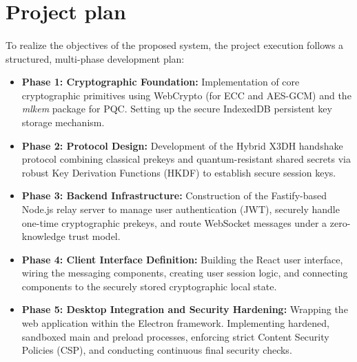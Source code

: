 \section{Project plan}
\paragraph{}
To realize the objectives of the proposed system, the project execution follows a structured, multi-phase development plan:
\begin{itemize}
	\item \textbf{Phase 1: Cryptographic Foundation:} Implementation of core cryptographic primitives using WebCrypto (for ECC and AES-GCM) and the \textit{mlkem} package for PQC. Setting up the secure IndexedDB persistent key storage mechanism.
	\item \textbf{Phase 2: Protocol Design:} Development of the Hybrid X3DH handshake protocol combining classical prekeys and quantum-resistant shared secrets via robust Key Derivation Functions (HKDF) to establish secure session keys.
	\item \textbf{Phase 3: Backend Infrastructure:} Construction of the Fastify-based Node.js relay server to manage user authentication (JWT), securely handle one-time cryptographic prekeys, and route WebSocket messages under a zero-knowledge trust model.
	\item \textbf{Phase 4: Client Interface Definition:} Building the React user interface, wiring the messaging components, creating user session logic, and connecting components to the securely stored cryptographic local state.
	\item \textbf{Phase 5: Desktop Integration and Security Hardening:} Wrapping the web application within the Electron framework. Implementing hardened, sandboxed main and preload processes, enforcing strict Content Security Policies (CSP), and conducting continuous final security checks.
\end{itemize}
